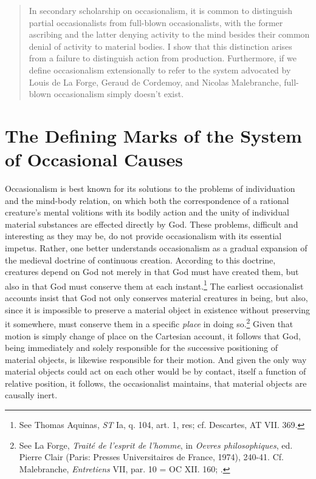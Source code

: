\documentclass[]{article}
\title{}
\author{}
\begin{document}
\maketitle

\begin{abstract}
In secondary scholarship on occasionalism, it is common to distinguish partial occasionalists from full-blown occasionalists, with the former ascribing and the latter denying activity to the mind besides their common denial of activity to material bodies. I show that this distinction arises from a failure to distinguish action from production. Furthermore, if we define occasionalism extensionally to refer to the system advocated by Louis de La Forge, Geraud de Cordemoy, and Nicolas Malebranche, full-blown occasionalism simply doesn't exist.
\end{abstract}

\section{The Defining Marks of the System of Occasional Causes}
Occasionalism is best known for its solutions to the problems of individuation and the mind-body relation, on which both the correspondence of a rational creature's mental volitions with its bodily action and the unity of individual material substances are effected directly by God. These problems, difficult and interesting as they may be, do not provide occasionalism with its essential impetus. Rather, one better understands occasionalism as a gradual expansion of the medieval doctrine of continuous creation. According to this doctrine, creatures depend on God not merely in that God must have created them, but also in that God must conserve them at each instant.\footnote{See Thomas Aquinas, \emph{ST} Ia, q. 104, art. 1, res; cf. Descartes, AT VII. 369.} The earliest occasionalist accounts insist that God not only conserves material creatures in being, but also, since it is impossible to preserve a material object in existence without preserving it somewhere, must conserve them in a specific \emph{place} in doing so.\footnote{See La Forge, \emph{Traité de l'esprit de l'homme}, in \emph{Oevres philosophiques}, ed. Pierre Clair (Paris: Presses Universitaires de France, 1974), 240-41. Cf. Malebranche, \emph{Entretiens} VII, par. 10 = OC XII. 160; \autocite{Nadler1998}.} Given that motion is simply change of place on the Cartesian account, it follows that God, being immediately and solely responsible for the successive positioning of material objects, is likewise responsible for their motion. And given the only way material objects could act on each other would be by contact, itself a function of relative position, it follows, the occasionalist maintains, that material objects are causally inert.
\end{document}
